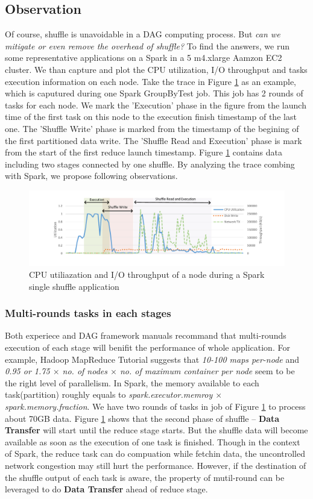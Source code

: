 \documentclass[10pt,twocolumn]{article}
\begin{document}
\subsection{Observation} \label{observation}
Of course, shuffle is unavoidable in a DAG computing process. But \textit{can we mitigate or even remove the overhead of shuffle?} To find the answers, we run some representative applications on a Spark in a 5 m4.xlarge Aamzon EC2 cluster. We than capture and plot the CPU utilization, I/O throughput and tasks execution information on each node. Take the trace in Figure \ref{fig:util} as an example, which is caputured during one Spark GroupByTest job. This job has 2 rounds of tasks for each node. We mark the 'Execution' phase in the figure from the launch time of the first task on this node to the execution finish timestamp of the last one. The 'Shuffle Write' phase is marked from the timestamp of the begining of the first partitioned data write. The 'Shuffle Read and Execution' phase is mark from the start of the first reduce launch timestamp.
Figure \ref{fig:util} contains data including two stages connected by one shuffle. By analyzing the trace combing with Spark, we propose following observations.
\begin{figure}
	\includegraphics[width=\textwidth]{fig/util}
	\caption{CPU utiliazation and I/O throughput of a node during a Spark single shuffle application}
	\label{fig:util}
\end{figure}

\subsubsection{Multi-rounds tasks in each stages}
Both experiece and DAG framework manuals recommand that multi-rounds execution of each stage will benifit the performance of whole application.
For example, Hadoop MapReduce Tutorial \cite{hadooptutorial} suggests that \textit{10-100 maps per-node} and \textit{0.95 or 1.75 $\times$ no. of nodes $\times$ no. of maximum container per node} seem to be the right level of parallelism. 
In Spark, the memory available to each task(partition) roughly equals to \textit{spark.executor.memroy $\times$ spark.memory.fraction}\cite{sparkconf}. 
We have two rounds of tasks in job of Figure \ref{fig:util} to process about 70GB data. Figure \ref{fig:util} shows that the second phase of shuffle -- \textbf{Data Transfer} will start until the reduce stage starts.
But the shuffle data will become available as soon as the execution of one task is finished. Though in the context of Spark, the reduce task can do compuation while fetchin data, the uncontrolled network congestion may still hurt the performance. However, if the destination of the shuffle output of each task is aware, the property of mutil-round can be leveraged to do \textbf{Data Transfer} ahead of reduce stage.
\end{document}
